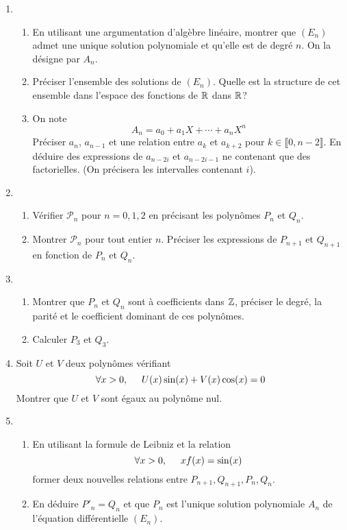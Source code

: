 \begin{enumerate}
  \item
\begin{enumerate}
  \item   En utilisant une argumentation d'algèbre linéaire, montrer que $(E_n)$ admet une unique solution polynomiale et qu'elle est de degré $n$. On la désigne par $A_n$.
  \item Préciser l'ensemble des solutions de $(E_n)$. Quelle est la structure de cet ensemble dans l'espace des fonctions de $\mathbb{R}$ dans $\mathbb{R}$?
  \item On note 
\begin{displaymath}
  A_n = a_0 + a_1X + \cdots +a_n X^n
\end{displaymath}
Préciser $a_n$, $a_{n-1}$ et une relation entre $a_k$ et $a_{k+2}$ pour $k\in \llbracket 0, n-2 \rrbracket$. En déduire des expressions de $a_{n-2i}$ et $a_{n-2i-1}$ ne contenant que des factorielles. (On précisera les intervalles contenant $i$).
\end{enumerate}

  \item 
\begin{enumerate}
  \item Vérifier $\mathcal{P}_n$ pour $n=0,1,2$ en précisant les polynômes $P_n$ et $Q_n$.
  \item Montrer $\mathcal{P}_n$ pour tout entier $n$. Préciser les expressions de $P_{n+1}$ et $Q_{n+1}$ en fonction de $P_n$ et $Q_n$.
\end{enumerate}
  
  \item
\begin{enumerate}
  \item Montrer que $P_n$ et $Q_n$ sont à coefficients dans $\mathbb{Z}$, préciser le degré, la parité et le coefficient dominant de ces polynômes.
  \item Calculer $P_3$ et $Q_3$. 
\end{enumerate}

  \item Soit $U$ et $V$ deux polynômes vérifiant
\begin{displaymath}
\forall x>0,\hspace{0.5cm} U(x)\sin(x) + V(x)\cos(x) = 0  
\end{displaymath}
Montrer que $U$ et $V$ sont égaux au polynôme nul.

  \item 
\begin{enumerate}
\item En utilisant la formule de Leibniz et la relation
\begin{displaymath}
\forall x>0,\hspace{0.5cm} xf(x) = \sin(x)    
\end{displaymath}
former deux nouvelles relations entre $P_{n+1}, Q_{n+1}, P_n, Q_n$.
\item En déduire $P'_n = Q_n$ et que $P_n$ est l'unique solution polynomiale $A_n$ de l'équation différentielle $(E_n)$.
\end{enumerate}

\end{enumerate}
  

